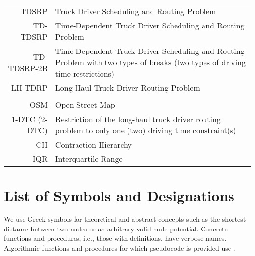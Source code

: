 \begin{tabular}{rp{}}
	TDSRP         & Truck Driver Scheduling and Routing Problem                                                                                  \\
	TD-TDSRP      & Time-Dependent Truck Driver Scheduling and Routing Problem                                                                   \\
	TD-TDSRP-2B   & Time-Dependent Truck Driver Scheduling and Routing Problem with two types of breaks (two types of driving time restrictions) \\
	LH-TDRP       & Long-Haul Truck Driver Routing Problem                                                                                       \\
	\vspace{2\baselineskip}                                                                                                                      \\
	OSM           & Open Street Map                                                                                                              \\
	1-DTC (2-DTC) & Restriction of the long-haul truck driver routing problem to only one (two) driving time constraint(s)                       \\
	CH            & Contraction Hierarchy                                                                                                        \\
	IQR           & Interquartile Range
\end{tabular}



\section{List of Symbols and Designations}
\label{app:symbols}

We use Greek symbols for theoretical and abstract concepts such as the shortest distance between two nodes or an arbitrary valid node potential. Concrete functions and procedures, i.e., those with definitions, have verbose names. Algorithmic functions and procedures for which pseudocode is provided use .

